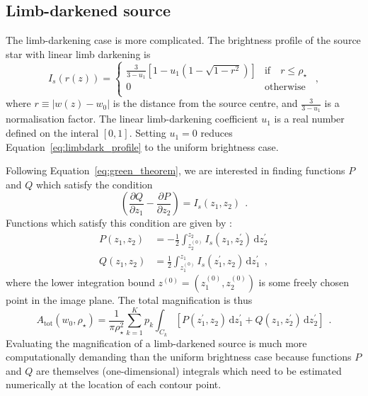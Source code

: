 \documentclass[12pt,dvipsnames]{report}
\newcommand{\ud}{\,\mathrm{d}}
\newcommand{\hquad}{~~}
\begin{document}
\subsection{Limb-darkened source}
\label{ssec:mag_limbdark}
The limb-darkening case is more complicated. The brightness profile of the source star with
linear limb darkening is 
\begin{equation}
    I_s(r(z))=
    \begin{cases}\frac{3}{3-u_1}\left[1 - u_1\left(1 - \sqrt{1-r^2}\right)\right] &\text{if} \quad r\leq\rho_\star\\
        0 &\text{otherwise}\\
    \end{cases}
    \hquad,
    \label{eq:limbdark_profile}
\end{equation}
where $r\equiv |w(z)-w_0|$ is the distance from the source centre, and $\frac{3}{3-u_1}$ is a 
normalisation factor. The linear limb-darkening coefficient $u_1$
is a real number defined on the interal $[0,1]$. Setting $u_1=0$ reduces 
Equation~\ref{eq:limbdark_profile} to the uniform brightness case.

Following Equation~\ref{eq:green_theorem}, we are interested in finding 
functions $P$ and $Q$ which satisfy the condition
\begin{equation}
\left(\frac{\partial Q}{\partial z_{1}} - 
\frac{\partial P}{\partial z_{2}} \right) = I_s(z_1,z_2)
\hquad.
\end{equation}
Functions which satisfy this condition are given by \citep{1998A&A...333L..79D}:
\begin{align}
P\left(z_1, z_2\right)&=-\frac{1}{2} \int_{z_2^{(0)}}^{z_2} I_s\left(z_1, z_2^{\prime}\right) \ud z_2^{\prime}\\
Q\left(z_1, z_2\right)&=\frac{1}{2} \int_{z_1^{(0)}}^{z_1} I_s\left(z_1^{\prime}, z_2\right) \ud z_1^{\prime}
\hquad,
\label{eq:p_and_q_functions_ld}
\end{align}
where the lower integration bound $z^{(0)}=(z_1^{(0)},z_2^{(0)})$ is some freely chosen point
in the image plane. The total magnification is thus 
\begin{equation}
    A_\mathrm{tot}\left(w_0, \rho_{\star}\right)=\frac{1}{\pi \rho_{\star}^{2}}
    \sum_{k=1}^Kp_k\int_{C_k} \left[P(z_1^\prime, z_2)\ud z_1^\prime + Q(z_1, z_2^\prime)\ud z_2^\prime\right]
    \hquad.
    \label{eq:mag_green_theorem_ld_expanded}
\end{equation}
Evaluating the magnification of a limb-darkened source is much 
more computationally demanding than the uniform brightness case  because functions $P$ and
$Q$ are themselves (one-dimensional) integrals which need to be estimated numerically at the location of 
each contour point.
\end{document}

